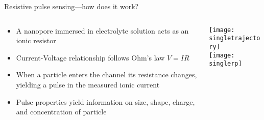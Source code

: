 \begin{frame}[c]{Resistive pulse sensing---how does it work?}

	\begin{columns}[t]
		\begin{column}[T]{2.75in}
	      
	

			\begin{tiny}
				\begin{itemize}
				
					\item A nanopore immersed in electrolyte solution acts as an ionic resistor
					\item Current-Voltage relationship follows Ohm's law $V=IR$
					\item When a particle enters the channel its resistance changes, yielding a pulse in the measured ionic current
					\item Pulse properties yield information on size, shape, charge, and concentration of particle
				\end{itemize}
			\end{tiny}
			
		\end{column}
		
		\begin{column}[T]{1.75in}
			{\centering
				\vspace{.5cm}
				\texttt{[image: singletrajectory]} \\
				\vspace{.75cm}
				\texttt{[image: singlerp]} \\
				\par
			}
			
		\end{column}

	
	
	\end{columns}
	
\end{frame}






